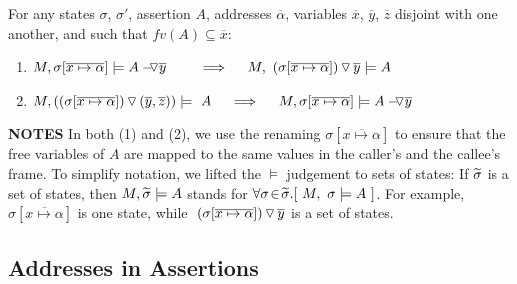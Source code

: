 {{\begin{lemma} 
\label{lemma:push:ass:state}
For any states  $\sigma$, $\sigma'$, assertion $A$, addresses $\overline \alpha$,   variables $\overline x$, $\overline y$, $\overline z$ disjoint with one another,  and such that 
$fv(A)\subseteq \overline x$:
\begin{enumerate}
 \item
 \label{lemma:push:ass:state:one}
$M, \sigma[\overline{x \mapsto \alpha} ] \models \PushAS {y} {A}\ \ \ \ \ \ \   \Longrightarrow  \ \ \ \ M,  \PushS {y} {(\sigma[\overline{x \mapsto \alpha}])}   \models A$
\item
\label{lemma:push:ass:state:two}
$M, {(\PushSLong {(\overline y, \overline z)} {(\sigma[\overline{x \mapsto \alpha} ] )})}  \models\  A \  \ \ \ \Longrightarrow  \ \ \ \ M,  \sigma[\overline{x \mapsto \alpha} ] \models  \PushAS  {y} {A}$
\end{enumerate}
\end{lemma}
 


\noindent
\textbf{NOTES} \notesep In both (1) and (2), we  use the renaming $\sigma[\overline{x \mapsto \alpha} ]$ to ensure that the free variables of $A$ are mapped to the same values in the caller's and the callee's frame.
 \notesep 
To simplify notation,  we lifted the $\models$ judgement to %
sets of states: If  $\sigmas$ is a set of states,  then
$M,   \sigmas \models A$ stands for  $\forall\sigma\! \in\! \sigmas.[\ M, \  \sigma \models A \ ]$. For example, $\sigma[\overline{x \mapsto \alpha} ]$ is one state, while 
 $\PushS {y} {(\sigma[\overline{x \mapsto \alpha}])}$ is a set of states. 
   


\subsection{Addresses in Assertions}

}}
